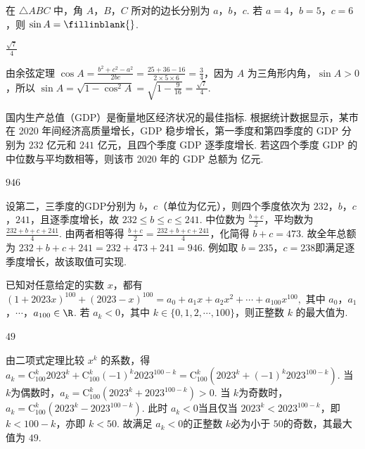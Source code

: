 \begin{problem}
在 \(\triangle ABC\) 中，角 \(A\)，\(B\)，\(C\) 所对的边长分别为 \(a\)，\(b\)，\(c\). 若 \(a=4\)，\(b=5\)，\(c=6\)，则 \(\sin A=\fillinblank{}\).
\end{problem}

\begin{answer}
\(\frac{\sqrt7}{4}\)
\end{answer}

\begin{solution}
由余弦定理 \(\cos A=\frac{b^2+c^2-a^2}{2bc}=\frac{25+36-16}{2\times 5\times 6}=\frac34\)，因为 \(A\) 为三角形内角，\(\sin A>0\)，所以 \(\sin A=\sqrt{1-\cos^2 A}=\sqrt{1-\frac{9}{16}}=\frac{\sqrt7}{4}\).
\end{solution}

\begin{problem}
国内生产总值（GDP）是衡量地区经济状况的最佳指标. 根据统计数据显示，某市在 2020 年间经济高质量增长，GDP 稳步增长，第一季度和第四季度的 GDP 分别为 \(232\) 亿元和 \(241\) 亿元，且四个季度 GDP 逐季度增长. 若这四个季度 GDP 的中位数与平均数相等，则该市 2020 年的 GDP 总额为\fillinblank{} 亿元.
\end{problem}

\begin{answer}
\(946\)
\end{answer}

\begin{solution}
设第二，三季度的GDP分别为 \(b\)，\(c\)（单位为亿元），则四个季度依次为 \(232\)，\(b\)，\(c\)，\(241\)，且逐季度增长，故 \(232\le b\le c\le 241\). 中位数为 \(\frac{b+c}{2}\)，平均数为 \(\frac{232+b+c+241}{4}\). 由两者相等得 \(\frac{b+c}{2}=\frac{232+b+c+241}{4}\)，化简得 \(b+c=473\). 故全年总额为 \(232+b+c+241=232+473+241=946\). 例如取 \(b=235\)，\(c=238\)即满足逐季度增长，故该取值可实现.
\end{solution}

\begin{problem}
已知对任意给定的实数 \(x\)，都有
\(
\left(1+2023x\right)^{100}+\left(2023-x\right)^{100}=a_0+a_1x+a_2x^2+\cdots+a_{100}x^{100},
\)
其中 \(a_0\)，\(a_1\)，\(\cdots\)，\(a_{100}\in\R\). 若 \(a_k<0\)，其中 \(k\in\{0,1,2,\cdots,100\}\)，则正整数 \(k\) 的最大值为\fillinblank{}.
\end{problem}

\begin{answer}
\(49\)
\end{answer}

\begin{solution}
由二项式定理比较 \(x^{k}\) 的系数，得 \(a_{k}=\mathrm C_{100}^{k}2023^{k}+\mathrm C_{100}^{k}\left(-1\right)^{k}2023^{100-k}=\mathrm C_{100}^{k}\left(2023^{k}+\left(-1\right)^{k}2023^{100-k}\right)\). 当 \(k\)为偶数时，\(a_{k}=\mathrm C_{100}^{k}\left(2023^{k}+2023^{100-k}\right)>0\). 当 \(k\)为奇数时，\(a_{k}=\mathrm C_{100}^{k}\left(2023^{k}-2023^{100-k}\right)\). 此时 \(a_{k}<0\)当且仅当 \(2023^{k}<2023^{100-k}\)，即 \(k<100-k\)，亦即 \(k<50\). 故满足 \(a_{k}<0\)的正整数 \(k\)必为小于 \(50\)的奇数，其最大值为 \(49\).
\end{solution}

